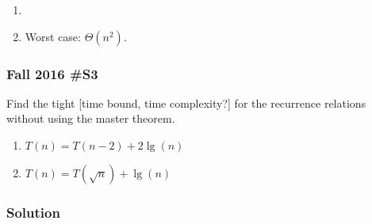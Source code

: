 \begin{enumerate}
	\item
	
	\item Worst case:  $\Theta (n^2)$.  
\end{enumerate}
	
\subsubsection{Fall 2016 \#S3}
	Find the tight [time bound, time complexity?] for the recurrence relations without using the master theorem. 
	\begin{enumerate}
		\item $T(n) = T(n-2) + 2 \lg(n)$
		\item $T(n) = T(\sqrt{n}) + \lg(n)$
	\end{enumerate}
	
\subsubsection{Solution}
	
